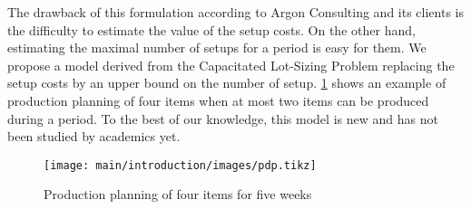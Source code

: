 The drawback of this formulation according to Argon Consulting and its clients is the difficulty to estimate the value of the setup costs.
On the other hand, estimating the maximal number of setups for a period is easy for them.
We propose a model derived from the Capacitated Lot-Sizing Problem replacing the setup costs by an upper bound on the number of setup.
\cref{fig:intro:en:pdp} shows an example of production planning of four items when at most two items can be produced during a period.
To the best of our knowledge, this model is new and has not been studied by academics yet.

\begin{figure}[!ht]
  \centering
  \texttt{[image: main/introduction/images/pdp.tikz]}
  \caption{Production planning of four items for five weeks}
  \label{fig:intro:en:pdp}
\end{figure}


